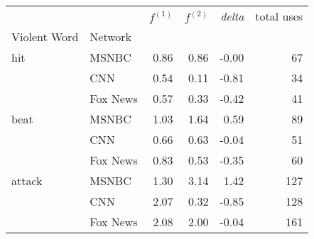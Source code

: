 \begin{tabular}{llrrrr}
\toprule
       &     & $f^{(1)}$ & $f^{(2)}$ & \emph{delta} & total uses \\
Violent Word & Network &           &           &            &            \\
\midrule
hit & MSNBC &      0.86 &      0.86 &      -0.00 &         67 \\
       & CNN &      0.54 &      0.11 &      -0.81 &         34 \\
       & Fox News &      0.57 &      0.33 &      -0.42 &         41 \\
\hline
beat & MSNBC &      1.03 &      1.64 &       0.59 &         89 \\
       & CNN &      0.66 &      0.63 &      -0.04 &         51 \\
       & Fox News &      0.83 &      0.53 &      -0.35 &         60 \\
\hline
attack & MSNBC &      1.30 &      3.14 &       1.42 &        127 \\
       & CNN &      2.07 &      0.32 &      -0.85 &        128 \\
       & Fox News &      2.08 &      2.00 &      -0.04 &        161 \\
\bottomrule
\end{tabular}
